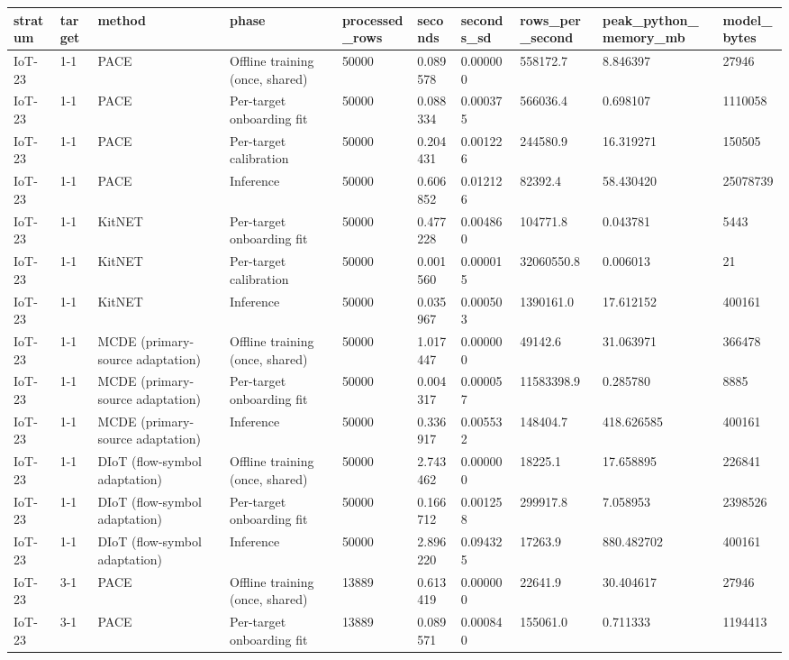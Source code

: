 \begin{tabular}{llllllllll}
\toprule
stratum & target & method & phase & processed\_rows & seconds & seconds\_sd & rows\_per\_second & peak\_python\_memory\_mb & model\_bytes \\
\midrule
IoT-23 & 1-1 & PACE & Offline training (once, shared) & 50000 & 0.089578 & 0.000000 & 558172.7 & 8.846397 & 27946 \\
IoT-23 & 1-1 & PACE & Per-target onboarding fit & 50000 & 0.088334 & 0.000375 & 566036.4 & 0.698107 & 1110058 \\
IoT-23 & 1-1 & PACE & Per-target calibration & 50000 & 0.204431 & 0.001226 & 244580.9 & 16.319271 & 150505 \\
IoT-23 & 1-1 & PACE & Inference & 50000 & 0.606852 & 0.012126 & 82392.4 & 58.430420 & 25078739 \\
IoT-23 & 1-1 & KitNET & Per-target onboarding fit & 50000 & 0.477228 & 0.004860 & 104771.8 & 0.043781 & 5443 \\
IoT-23 & 1-1 & KitNET & Per-target calibration & 50000 & 0.001560 & 0.000015 & 32060550.8 & 0.006013 & 21 \\
IoT-23 & 1-1 & KitNET & Inference & 50000 & 0.035967 & 0.000503 & 1390161.0 & 17.612152 & 400161 \\
IoT-23 & 1-1 & MCDE (primary-source adaptation) & Offline training (once, shared) & 50000 & 1.017447 & 0.000000 & 49142.6 & 31.063971 & 366478 \\
IoT-23 & 1-1 & MCDE (primary-source adaptation) & Per-target onboarding fit & 50000 & 0.004317 & 0.000057 & 11583398.9 & 0.285780 & 8885 \\
IoT-23 & 1-1 & MCDE (primary-source adaptation) & Inference & 50000 & 0.336917 & 0.005532 & 148404.7 & 418.626585 & 400161 \\
IoT-23 & 1-1 & DIoT (flow-symbol adaptation) & Offline training (once, shared) & 50000 & 2.743462 & 0.000000 & 18225.1 & 17.658895 & 226841 \\
IoT-23 & 1-1 & DIoT (flow-symbol adaptation) & Per-target onboarding fit & 50000 & 0.166712 & 0.001258 & 299917.8 & 7.058953 & 2398526 \\
IoT-23 & 1-1 & DIoT (flow-symbol adaptation) & Inference & 50000 & 2.896220 & 0.094325 & 17263.9 & 880.482702 & 400161 \\
IoT-23 & 3-1 & PACE & Offline training (once, shared) & 13889 & 0.613419 & 0.000000 & 22641.9 & 30.404617 & 27946 \\
IoT-23 & 3-1 & PACE & Per-target onboarding fit & 13889 & 0.089571 & 0.000840 & 155061.0 & 0.711333 & 1194413 \\

\end{tabular}
